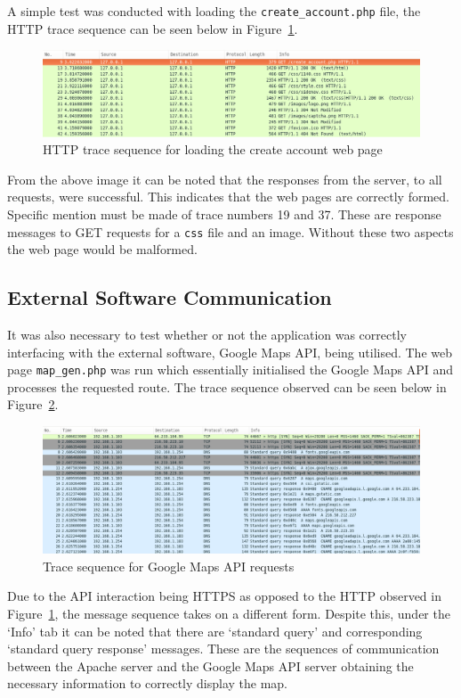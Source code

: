 \documentclass[10pt, a4paper, twocolumn]{scrartcl}
\begin{document}
		A simple test was conducted with loading the \texttt{create\_account.php} file, the HTTP trace sequence can be seen below in Figure~\ref{http_create_account}.
		
		\begin{figure}[h!]
			\centering
			\includegraphics[width = \textwidth]{../images/http_create_account.png}
			\caption{HTTP trace sequence for loading the create account web page}
			\label{http_create_account}
		\end{figure}
		
		From the above image it can be noted that the responses from the server, to all requests, were successful. This indicates that the web pages are correctly formed. Specific mention must be made of trace numbers 19 and 37. These are response messages to GET requests for a \texttt{css} file and an image. Without these two aspects the web page would be malformed.
		
	\subsection{External Software Communication}
	
		It was also necessary to test whether or not the application was correctly interfacing with the external software, Google Maps API, being utilised. The web page \texttt{map\_gen.php} was run which essentially initialised the Google Maps API and processes the requested route. The trace sequence observed can be seen below in Figure~\ref{wireshark_google_maps}.\\
		
		\begin{figure}[h!]
			\centering
			\includegraphics[width = \textwidth]{../images/wireshark_google_maps.png}
			\caption{Trace sequence for Google Maps API requests}
			\label{wireshark_google_maps}
		\end{figure}
		
		Due to the API interaction being HTTPS as opposed to the HTTP observed in Figure~\ref{http_create_account}, the message sequence takes on a different form. Despite this, under the `Info' tab it can be noted that there are `standard query' and corresponding `standard query response' messages. These are the sequences of communication between the Apache server and the Google Maps API server obtaining the necessary information to correctly display the map.
\end{document}
